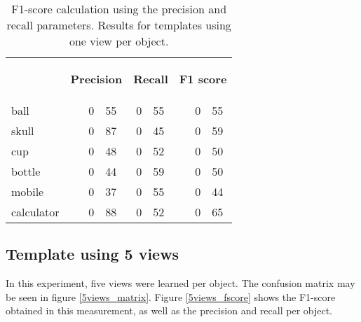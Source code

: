 \begin{table}[H]
\centering
\begin{tabular} {l l r@{.}l r@{.}l l r@{.}l }
\toprule
\addlinespace[3mm]
   \multicolumn{1}{c}{\begin{center}\textbf{Object}\end{center}} &
   \multicolumn{3}{c}{\begin{center}\textbf{Precision}\end{center}} &
   \multicolumn{2}{c}{\begin{center}\textbf{Recall}\end{center}} &
   \multicolumn{3}{c}{\begin{center}\hspace*{0.2cm}\textbf{F1 score}\end{center}} &\\
\addlinespace[-3mm]
\midrule
ball		&&	0&55 	&	0&55	&&	0&55	\\
skull		&&	0&87	&	0&45	&&	0&59	\\
cup			&&	0&48	&	0&52	&&	0&50	\\
bottle		&&	0&44	&	0&59	&&	0&50	\\
mobile		&&	0&37	&	0&55	&&	0&44	\\
calculator	&&	0&88	&	0&52	&&	0&65	\\
\bottomrule
\end{tabular}
\caption[F1-score - templates using 1 view]{F1-score calculation using the precision and recall parameters. Results for templates using one view per object. }
\label{1view_fscore}

\end{table}




\subsection{Template using 5 views}
In this experiment, five views were learned per object. 
The confusion matrix may be seen in figure \ref{5views_matrix}. 
Figure \ref{5views_fscore} shows the F1-score obtained in this measurement, as well as the precision and recall per object. 

